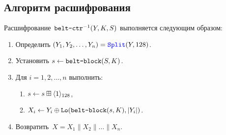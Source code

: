 \subsection{Алгоритм расшифрования}\label{CTR.Decr}

Расшифрование~$\texttt{belt-ctr}^{-1}(Y,K,S)$ выполняется следующим образом:
\begin{enumerate}
\item
Определить $(Y_1,Y_2,\ldots,Y_n)=\mathop{\textcolor{blue}{\texttt{Split}}}\nolimits(Y,128)$.
\item
Установить 
$s\leftarrow \texttt{belt-block}(S,K)$.
\item
Для $i=1,2,\ldots,n$ выполнить:
\begin{enumerate}
\item
$s\leftarrow s\boxplus\langle1\rangle_{128}$,
\item
$X_i\leftarrow Y_i\oplus\mathop{\texttt{Lo}}\nolimits(\texttt{belt-block}(s,K),|Y_i|)$.
\end{enumerate}
\item
Возвратить~$X=X_1\parallel X_2\parallel\ldots\parallel X_n$.
\end{enumerate}
